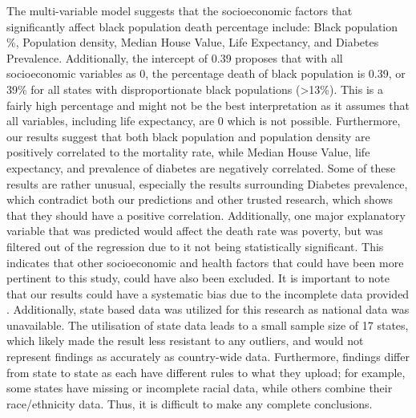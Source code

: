 \documentclass[10pt,twocolumn,letterpaper]{article}
\begin{document}
The multi-variable model suggests that the socioeconomic factors that significantly affect black population death percentage include: Black population \%, Population density, Median House Value, Life Expectancy, and Diabetes Prevalence. Additionally, the intercept of 0.39 proposes that with all socioeconomic variables as 0, the percentage death of black population is 0.39, or 39\% for all states with disproportionate black populations (>13\%).  This is a fairly high percentage and might not be the best interpretation as it assumes that all variables, including life expectancy, are 0 which is not possible. 
Furthermore, our results suggest that both black population and population density are positively correlated to the mortality rate, while Median House Value, life expectancy, and prevalence of diabetes are negatively correlated. Some of these results are rather unusual, especially the results surrounding  Diabetes prevalence, which contradict both our predictions and other trusted research, which shows that they should have a positive correlation.  \cite{diabetes}
Additionally, one major explanatory variable that was predicted would affect the death rate was poverty, but was filtered out of the regression due to it not being statistically significant. This indicates that other socioeconomic and health factors that could have been more pertinent to this study, could have also been excluded. 
It is important to note that our results could have a systematic bias due to the incomplete data provided . Additionally, state based data was utilized for this research as national data was unavailable. The utilisation of  state data leads to a small sample size of 17 states, which likely made the result less resistant to any outliers, and would not represent findings as accurately as country-wide data. Furthermore, findings differ from state to state as each have different rules to what they upload; for example, some states have missing or incomplete racial data, while others combine their race/ethnicity data. Thus, it is difficult to make any complete conclusions.



\end{document}
